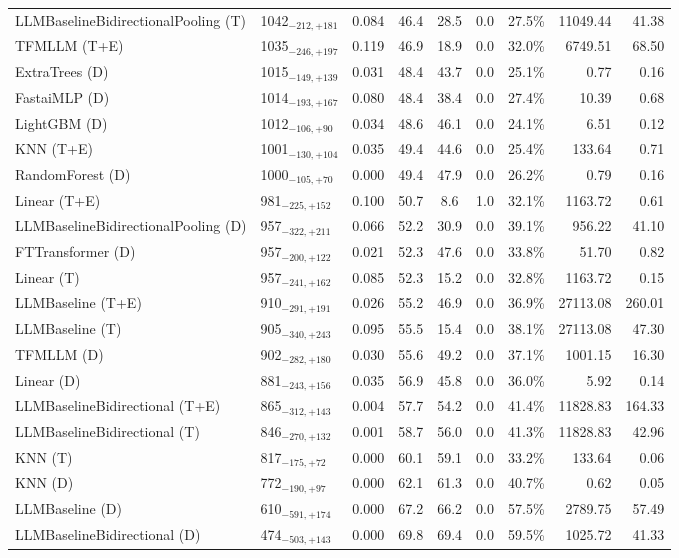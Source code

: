 \begin{tabular}{llcccccrr}
LLMBaselineBidirectionalPooling (T) & 1042${}_{-212,+181}$ & 0.084 & 46.4 & 28.5 & 0.0 & 27.5\% & 11049.44 & 41.38 \\
TFMLLM (T+E) & 1035${}_{-246,+197}$ & 0.119 & 46.9 & 18.9 & 0.0 & 32.0\% & 6749.51 & 68.50 \\
ExtraTrees (D) & 1015${}_{-149,+139}$ & 0.031 & 48.4 & 43.7 & 0.0 & 25.1\% & 0.77 & 0.16 \\
FastaiMLP (D) & 1014${}_{-193,+167}$ & 0.080 & 48.4 & 38.4 & 0.0 & 27.4\% & 10.39 & 0.68 \\
LightGBM (D) & 1012${}_{-106,+90}$ & 0.034 & 48.6 & 46.1 & 0.0 & 24.1\% & 6.51 & 0.12 \\
KNN (T+E) & 1001${}_{-130,+104}$ & 0.035 & 49.4 & 44.6 & 0.0 & 25.4\% & 133.64 & 0.71 \\
RandomForest (D) & 1000${}_{-105,+70}$ & 0.000 & 49.4 & 47.9 & 0.0 & 26.2\% & 0.79 & 0.16 \\
Linear (T+E) & 981${}_{-225,+152}$ & 0.100 & 50.7 & 8.6 & 1.0 & 32.1\% & 1163.72 & 0.61 \\
LLMBaselineBidirectionalPooling (D) & 957${}_{-322,+211}$ & 0.066 & 52.2 & 30.9 & 0.0 & 39.1\% & 956.22 & 41.10 \\
FTTransformer (D) & 957${}_{-200,+122}$ & 0.021 & 52.3 & 47.6 & 0.0 & 33.8\% & 51.70 & 0.82 \\
Linear (T) & 957${}_{-241,+162}$ & 0.085 & 52.3 & 15.2 & 0.0 & 32.8\% & 1163.72 & 0.15 \\
LLMBaseline (T+E) & 910${}_{-291,+191}$ & 0.026 & 55.2 & 46.9 & 0.0 & 36.9\% & 27113.08 & 260.01 \\
LLMBaseline (T) & 905${}_{-340,+243}$ & 0.095 & 55.5 & 15.4 & 0.0 & 38.1\% & 27113.08 & 47.30 \\
TFMLLM (D) & 902${}_{-282,+180}$ & 0.030 & 55.6 & 49.2 & 0.0 & 37.1\% & 1001.15 & 16.30 \\
Linear (D) & 881${}_{-243,+156}$ & 0.035 & 56.9 & 45.8 & 0.0 & 36.0\% & 5.92 & 0.14 \\
LLMBaselineBidirectional (T+E) & 865${}_{-312,+143}$ & 0.004 & 57.7 & 54.2 & 0.0 & 41.4\% & 11828.83 & 164.33 \\
LLMBaselineBidirectional (T) & 846${}_{-270,+132}$ & 0.001 & 58.7 & 56.0 & 0.0 & 41.3\% & 11828.83 & 42.96 \\
KNN (T) & 817${}_{-175,+72}$ & 0.000 & 60.1 & 59.1 & 0.0 & 33.2\% & 133.64 & 0.06 \\
KNN (D) & 772${}_{-190,+97}$ & 0.000 & 62.1 & 61.3 & 0.0 & 40.7\% & 0.62 & 0.05 \\
LLMBaseline (D) & 610${}_{-591,+174}$ & 0.000 & 67.2 & 66.2 & 0.0 & 57.5\% & 2789.75 & 57.49 \\
LLMBaselineBidirectional (D) & 474${}_{-503,+143}$ & 0.000 & 69.8 & 69.4 & 0.0 & 59.5\% & 1025.72 & 41.33 \\
\bottomrule
\end{tabular}